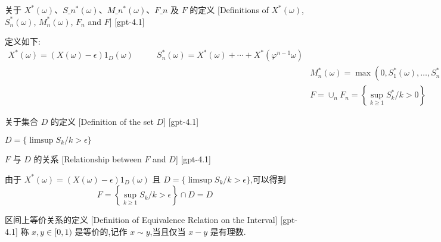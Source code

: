 \documentclass[UTF8]{ctexart}
\begin{document}
    \begin{dfn}
        {关于 $X^*(\omega)$、$S\_n^*(\omega)$、$M\_n^*(\omega)$、$F\_n$ 及 $F$ 的定义}
        [Definitions of $X^*(\omega)$, $S_n^*(\omega)$, $M_n^*(\omega)$, $F_n$ and $F$]
        [gpt-4.1]
        
定义如下:
\[
\begin{array}{rlr}
X^{*}(\omega) = (X(\omega) - \epsilon) 1_{D}(\omega) \qquad & S_{n}^{*}(\omega) = X^{*}(\omega) + \cdots + X^{*}(\varphi^{n-1} \omega) \\
& & M_{n}^{*}(\omega) = \max(0, S_{1}^{*}(\omega), \dots, S_{n}^{*}(\omega)) \qquad F_{n} = \{M_{n}^{*} > 0\} \\
& & F = \cup_{n} F_{n} = \left\{ \sup_{k \geq 1} S_{k}^{*}/k > 0 \right\}
\end{array}
\]

    \end{dfn}
    
    
    
    \begin{dfn}
        {关于集合 $D$ 的定义}
        [Definition of the set $D$]
        [gpt-4.1]
        
$D = \{\limsup S_{k}/k > \epsilon\}$

    \end{dfn}
    
    
    
    \begin{ppt}
        {$F$ 与 $D$ 的关系}
        [Relationship between $F$ and $D$]
        [gpt-4.1]
        
由于 $X^{*}(\omega) = (X(\omega) - \epsilon) 1_{D}(\omega)$ 且 $D = \{\limsup S_{k}/k > \epsilon\}$,可以得到
\[
F = \left\{ \sup_{k \geq 1} S_{k}/k > \epsilon \right\} \cap D = D
\]

    \end{ppt}
    
    
    
    \begin{dfn}
        {区间上等价关系的定义}
        [Definition of Equivalence Relation on the Interval]
        [gpt-4.1]
        称 $x , y \in [ 0 , 1 )$ 是等价的,记作 $x \sim y$,当且仅当 $x - y$ 是有理数.
    \end{dfn}
    
    
    
\end{document}
